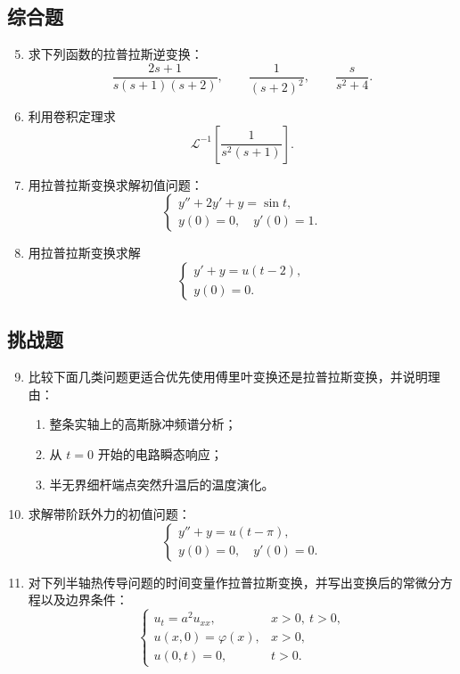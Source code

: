 \subsection*{综合题}

\begin{enumerate}[label=\arabic*.]
    \setcounter{enumi}{4}
    \item 求下列函数的拉普拉斯逆变换：
    \[
        \frac{2s+1}{s(s+1)(s+2)},
        \qquad
        \frac{1}{(s+2)^2},
        \qquad
        \frac{s}{s^2+4}.
    \]

    \item 利用卷积定理求
    \[
        \mathcal{L}^{-1}\left[\frac{1}{s^2(s+1)}\right].
    \]

    \item 用拉普拉斯变换求解初值问题：
    \[
        \begin{cases}
            y''+2y'+y=\sin t,\\
            y(0)=0,\quad y'(0)=1.
        \end{cases}
    \]

    \item 用拉普拉斯变换求解
    \[
        \begin{cases}
            y'+y=u(t-2),\\
            y(0)=0.
        \end{cases}
    \]
\end{enumerate}

\subsection*{挑战题}

\begin{enumerate}[label=\arabic*.]
    \setcounter{enumi}{8}
    \item 比较下面几类问题更适合优先使用傅里叶变换还是拉普拉斯变换，并说明理由：
    \begin{enumerate}
        \item 整条实轴上的高斯脉冲频谱分析；
        \item 从 $t=0$ 开始的电路瞬态响应；
        \item 半无界细杆端点突然升温后的温度演化。
    \end{enumerate}

    \item 求解带阶跃外力的初值问题：
    \[
        \begin{cases}
            y''+y=u(t-\pi),\\
            y(0)=0,\quad y'(0)=0.
        \end{cases}
    \]

    \item 对下列半轴热传导问题的时间变量作拉普拉斯变换，并写出变换后的常微分方程以及边界条件：
    \[
        \begin{cases}
            u_t=a^2u_{xx}, & x>0,\ t>0,\\
            u(x,0)=\varphi(x), & x>0,\\
            u(0,t)=0, & t>0.
        \end{cases}
    \]
\end{enumerate}

